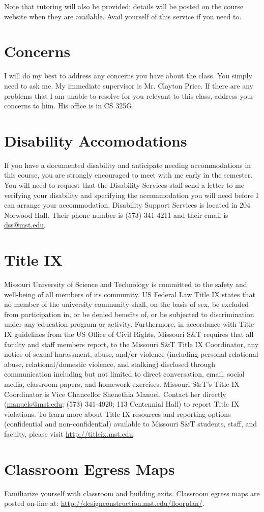 \documentclass{article}
\begin{document}
Note that tutoring will also be provided; details will be posted on the course website when they are available.
Avail yourself of this service if you need to.

\section{Concerns}
I will do my best to address any concerns you have about the class.
You simply need to ask me.
My immediate supervisor is Mr. Clayton Price. If there are any problems that I am unable to resolve for you relevant to this class, address your concerns to him. His office is in CS 325G.

\section{Disability Accomodations}
If you have a documented disability and anticipate needing accommodations in this course, you are strongly encouraged to meet with me early in the semester.
You will need to request that the Disability Services staff send a letter to me verifying your disability and specifying the accommodation you will need before I can arrange your accommodation.
Disability Support Services is located in 204 Norwood Hall.
Their phone number is (573) 341-4211 and their email is \href{mailto:dss@mst.edu}{dss@mst.edu}.

\section{Title IX}
Missouri University of Science and Technology is committed to the safety and well-being of all members of its community.
US Federal Law Title IX states that no member of the university community shall, on the basis of sex, be excluded from participation in, or be denied benefits of, or be subjected to discrimination under any education program or activity.
Furthermore, in accordance with Title IX guidelines from the US Office of Civil Rights, Missouri S\&T requires that all faculty and staff members report, to the Missouri S\&T Title IX Coordinator, any notice of sexual harassment, abuse, and/or violence (including personal relational abuse, relational/domestic violence, and stalking) disclosed through communication including but not limited to direct conversation, email, social media, classroom papers, and homework exercises. Missouri S\&T’s Title IX Coordinator is Vice Chancellor Shenethia Manuel.
Contact her directly (\href{mailto:manuels@mst.edu}{manuels@mst.edu}; (573) 341-4920; 113 Centennial Hall) to report Title IX violations.
To learn more about Title IX resources and reporting options (confidential and non-confidential) available to Missouri S\&T students, staff, and faculty, please visit \href{http://titleix.mst.edu}{http://titleix.mst.edu}.

\section{Classroom Egress Maps}
Familiarize yourself with classroom and building exits. Classroom egress maps are posted on-line at: \href{http://designconstruction.mst.edu/floorplan/}{http://designconstruction.mst.edu/floorplan/}.
\end{document}
